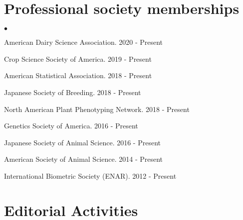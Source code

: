 \documentclass[margin,line,10pt]{res}
\newenvironment{list2}{
  \begin{list}{$\bullet$}{%
      \setlength{\itemsep}{0in}
      \setlength{\parsep}{0in} \setlength{\parskip}{0in}
      \setlength{\topsep}{0in} \setlength{\partopsep}{0in} 
      \setlength{\leftmargin}{0.2in}}}{\end{list}}
\begin{document}
\begin{resume}
\vspace{0.5cm}
\section{\sc Professional society memberships}
\begin{list2}
  \item American Dairy Science Association. 2020 - Present
    \vspace{0.3cm}
  \item Crop Science Society of America. 2019 - Present
    \vspace{0.3cm}
  \item American Statistical Association. 2018 - Present
    \vspace{0.3cm}
  \item  Japanese Society of Breeding. 2018 - Present
      \vspace{0.3cm}
\item North American Plant Phenotyping Network. 2018 - Present
  \vspace{0.3cm}
\item  Genetics Society of America. 2016 - Present
  \vspace{0.3cm}
\item  Japanese Society of Animal Science. 2016 - Present
  \vspace{0.3cm}
\item American Society of Animal Science. 2014 - Present
  \vspace{0.3cm}
\item International Biometric Society (ENAR). 2012 - Present
\end{list2}



\vspace{0.5cm}
\section{\sc Editorial Activities}



\end{resume}
\end{document}
